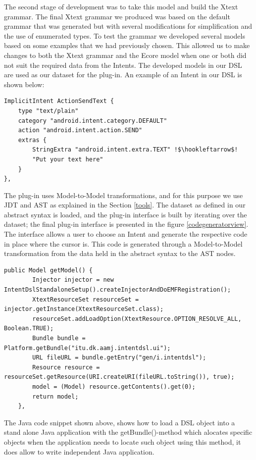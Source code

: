 The second stage of development was to take this model and build the Xtext grammar. The final Xtext grammar we produced was based on the default grammar that was generated but with several modifications for simplification and the use of enumerated types. To test the grammar we developed several models based on some examples that we had previously chosen. This allowed us to make changes to both the Xtext grammar and the Ecore model when one or both did not suit the required data from the Intents. The developed models in our DSL are used as our dataset for the plug-in. An example of an Intent in our DSL is shown below:

{\footnotesize\begin{lstlisting}[escapechar=!]
ImplicitIntent ActionSendText {
	type "text/plain"
	category "android.intent.category.DEFAULT"
	action "android.intent.action.SEND"
	extras {
		StringExtra "android.intent.extra.TEXT" !$\hookleftarrow$!
		"Put your text here"
	}
},
\end{lstlisting}}

The plug-in uses Model-to-Model transformations, and for this purpose we use JDT and AST as explained in the Section \ref{tools}. The dataset as defined in our abstract syntax is loaded, and the plug-in interface is built by iterating over the dataset; the final plug-in interface is presented in the figure \ref{codegeneratorview}. The interface allows a user to choose an Intent and generate the respective code in place where the cursor is. This code is generated through a Model-to-Model transformation from the data held in the abstract syntax to the AST nodes.

{\footnotesize\begin{lstlisting}[escapechar=!]
public Model getModel() {
		Injector injector = new IntentDslStandaloneSetup().createInjectorAndDoEMFRegistration();
		XtextResourceSet resourceSet = injector.getInstance(XtextResourceSet.class);
		resourceSet.addLoadOption(XtextResource.OPTION_RESOLVE_ALL, Boolean.TRUE);
		Bundle bundle = Platform.getBundle("itu.dk.aamj.intentdsl.ui");
		URL fileURL = bundle.getEntry("gen/i.intentdsl");
		Resource resource = resourceSet.getResource(URI.createURI(fileURL.toString()), true);
		model = (Model) resource.getContents().get(0);
		return model;
	},
\end{lstlisting}}

The Java code snippet shown above, shows how to load a DSL object into a stand alone Java application with the getBundle()-method which alocates specific objects when the application needs to locate such object using this method, it does allow to write independent Java application.

